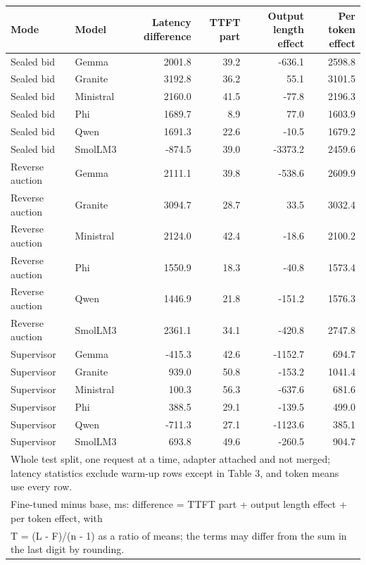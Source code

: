 \begin{tabular}{llrrrr}
\toprule
Mode & Model & Latency difference & TTFT part & Output length effect & Per token effect \\
\midrule
Sealed bid & Gemma & 2001.8 & 39.2 & -636.1 & 2598.8 \\
Sealed bid & Granite & 3192.8 & 36.2 & 55.1 & 3101.5 \\
Sealed bid & Ministral & 2160.0 & 41.5 & -77.8 & 2196.3 \\
Sealed bid & Phi & 1689.7 & 8.9 & 77.0 & 1603.9 \\
Sealed bid & Qwen & 1691.3 & 22.6 & -10.5 & 1679.2 \\
Sealed bid & SmolLM3 & -874.5 & 39.0 & -3373.2 & 2459.6 \\
Reverse auction & Gemma & 2111.1 & 39.8 & -538.6 & 2609.9 \\
Reverse auction & Granite & 3094.7 & 28.7 & 33.5 & 3032.4 \\
Reverse auction & Ministral & 2124.0 & 42.4 & -18.6 & 2100.2 \\
Reverse auction & Phi & 1550.9 & 18.3 & -40.8 & 1573.4 \\
Reverse auction & Qwen & 1446.9 & 21.8 & -151.2 & 1576.3 \\
Reverse auction & SmolLM3 & 2361.1 & 34.1 & -420.8 & 2747.8 \\
Supervisor & Gemma & -415.3 & 42.6 & -1152.7 & 694.7 \\
Supervisor & Granite & 939.0 & 50.8 & -153.2 & 1041.4 \\
Supervisor & Ministral & 100.3 & 56.3 & -637.6 & 681.6 \\
Supervisor & Phi & 388.5 & 29.1 & -139.5 & 499.0 \\
Supervisor & Qwen & -711.3 & 27.1 & -1123.6 & 385.1 \\
Supervisor & SmolLM3 & 693.8 & 49.6 & -260.5 & 904.7 \\
\bottomrule
\multicolumn{6}{l}{\footnotesize Whole test split, one request at a time, adapter attached and not merged; latency statistics exclude warm-up rows except in Table 3, and token means use every row.} \\
\multicolumn{6}{l}{\footnotesize Fine-tuned minus base, ms: difference = TTFT part + output length effect + per token effect, with} \\
\multicolumn{6}{l}{\footnotesize T = (L - F)/(n - 1) as a ratio of means; the terms may differ from the sum in the last digit by rounding.} \\
\end{tabular}
